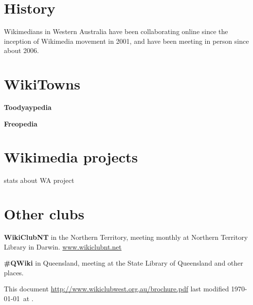 \documentclass[a4paper,12pt]{article}
\begin{document}
\begin{multicols}{3}
\section{History}

Wikimedians in Western Australia have been collaborating online since the inception of Wikimedia movement in 2001,
and have been meeting in person since about 2006.

\section{WikiTowns}

\textbf{Toodyaypedia}

\textbf{Freopedia}

\section{Wikimedia projects}

stats about WA project

\section{Other clubs}

\textbf{WikiClubNT} in the Northern Territory, meeting monthly at Northern Territory Library in Darwin.
\url{www.wikiclubnt.net}

\textbf{\#QWiki} in Queensland, meeting at the State Library of Queensland and other places.

\vfill
{\tiny This document \url{http://www.wikiclubwest.org.au/brochure.pdf} last modified \today\ at \currenttime.}

\end{multicols}
\end{document}

